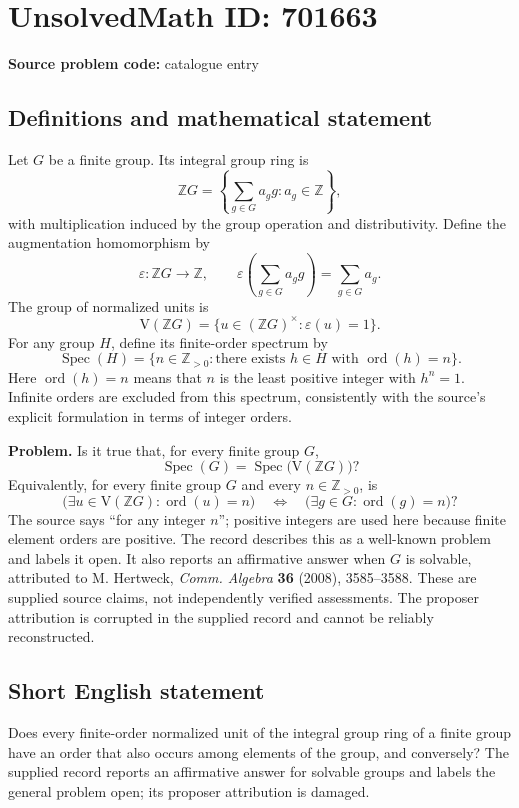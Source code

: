 \documentclass[11pt]{article}
\begin{document}
\section*{UnsolvedMath ID: 701663}
\textbf{Source problem code:} catalogue entry
\subsection{Definitions and mathematical statement}
Let \(G\) be a finite group. Its integral group ring is
\[
\mathbb ZG=\left\{\sum_{g\in G}a_g g:a_g\in\mathbb Z\right\},
\]
with multiplication induced by the group operation and distributivity. Define the augmentation homomorphism by
\[
\varepsilon:\mathbb ZG\longrightarrow\mathbb Z,
\qquad \varepsilon\!\left(\sum_{g\in G}a_g g\right)=\sum_{g\in G}a_g.
\]
The group of normalized units is
\[
\mathrm V(\mathbb ZG)=\{u\in(\mathbb ZG)^\times:\varepsilon(u)=1\}.
\]
For any group \(H\), define its finite-order spectrum by
\[
\operatorname{Spec}(H)=\{n\in\mathbb Z_{>0}:\text{there exists }h\in H\text{ with }\operatorname{ord}(h)=n\}.
\]
Here \(\operatorname{ord}(h)=n\) means that \(n\) is the least positive integer with \(h^n=1\). Infinite orders are excluded from this spectrum, consistently with the source's explicit formulation in terms of integer orders.

\textbf{Problem.} Is it true that, for every finite group \(G\),
\[
\operatorname{Spec}(G)=\operatorname{Spec}\bigl(\mathrm V(\mathbb ZG)\bigr)?
\]
Equivalently, for every finite group \(G\) and every \(n\in\mathbb Z_{>0}\), is
\[
\bigl(\exists u\in\mathrm V(\mathbb ZG):\operatorname{ord}(u)=n\bigr)
\quad\Longleftrightarrow\quad
\bigl(\exists g\in G:\operatorname{ord}(g)=n\bigr)?
\]
The source says ``for any integer \(n\)''; positive integers are used here because finite element orders are positive. The record describes this as a well-known problem and labels it open. It also reports an affirmative answer when \(G\) is solvable, attributed to M. Hertweck, \emph{Comm. Algebra} \textbf{36} (2008), 3585--3588. These are supplied source claims, not independently verified assessments. The proposer attribution is corrupted in the supplied record and cannot be reliably reconstructed.
\subsection{Short English statement}
Does every finite-order normalized unit of the integral group ring of a finite group have an order that also occurs among elements of the group, and conversely? The supplied record reports an affirmative answer for solvable groups and labels the general problem open; its proposer attribution is damaged.
\end{document}
